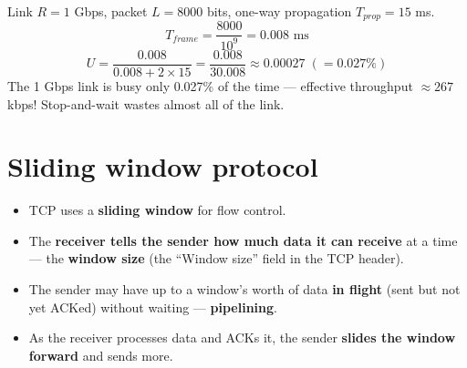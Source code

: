 \begin{workedex}
Link $R = 1$ Gbps, packet $L = 8000$ bits, one-way propagation $T_{prop} = 15$ ms.
\[ T_{frame} = \frac{8000}{10^9} = 0.008 \text{ ms} \]
\[ U = \frac{0.008}{0.008 + 2\times 15} = \frac{0.008}{30.008} \approx 0.00027 \;(= 0.027\%) \]
The 1 Gbps link is busy only 0.027\% of the time --- effective throughput $\approx 267$ kbps! Stop-and-wait wastes almost all of the link.
\end{workedex}

\section{Sliding window protocol}
\begin{itemize}
  \item TCP uses a \textbf{sliding window} for flow control.
  \item The \textbf{receiver tells the sender how much data it can receive} at a time --- the \textbf{window size} (the ``Window size'' field in the TCP header).
  \item The sender may have up to a window's worth of data \textbf{in flight} (sent but not yet ACKed) without waiting --- \textbf{pipelining}.
  \item As the receiver processes data and ACKs it, the sender \textbf{slides the window forward} and sends more.
\end{itemize}

\begin{center}
\end{center}

